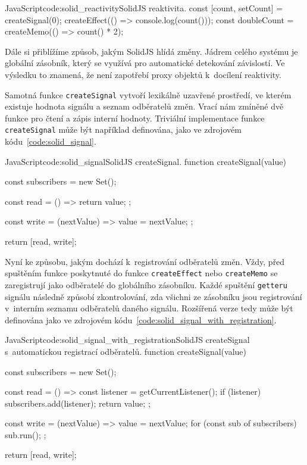 \documentclass[
  master,
  program=ainf,
  printversion,
  tables=false,
  sourcecodes,
  glossaries,
  index
]{kidiplom}
\begin{document}
  \begin{kicode}{JavaScript}{code:solid_reactivity}{SolidJS reaktivita.}
    const [count, setCount] = createSignal(0);
    createEffect(() => console.log(count()));
    const doubleCount = createMemo(() => count() * 2);
  \end{kicode}

Dále si přiblížíme způsob, jakým SolidJS hlídá změny. Jádrem celého systému je globální zásobník, který
se využívá pro automatické detekování závislostí. Ve výsledku to znamená, že není zapotřebí proxy objektů
k~docílení reaktivity.

Samotná funkce {\tt createSignal} vytvoří lexikálně uzavřené prostředí, ve kterém existuje hodnota
signálu a seznam odběratelů změn. Vrací nám zmíněné dvě funkce pro čtení a zápis interní hodnoty.
Triviální implementace funkce {\tt createSignal} může být například definována, jako ve zdrojovém 
kódu~\ref{code:solid_signal}.

  \begin{kicode}{JavaScript}{code:solid_signal}{SolidJS createSignal.}
    function createSignal(value) {
      const subscribers = new Set();

      const read = () => {
        return value;
      };

      const write = (nextValue) => {
        value = nextValue;
      };

      return [read, write];
    }
  \end{kicode}

Nyní ke způsobu, jakým dochází k~registrování odběratelů změn. Vždy, před spuštěním funkce poskytnuté do 
funkce {\tt createEffect} nebo {\tt createMemo} se zaregistrují jako odběratelé do globálního zásobníku. Každé spuštění
{\tt getteru} signálu následně způsobí zkontrolování, zda všichni ze zásobníku jsou registrování v~interním seznamu
odběratelů daného signálu. Rozšířená verze tedy může být definována jako ve zdrojovém kódu~\ref{code:solid_signal_with_registration}.

\begin{absolutelynopagebreak}
  \begin{kicode}{JavaScript}{code:solid_signal_with_registration}{SolidJS createSignal s~automatickou registrací odběratelů.}
    function createSignal(value) {
      const subscribers = new Set();

      const read = () => {
        const listener = getCurrentListener();
        if (listener) subscribers.add(listener);
        return value;
      };

      const write = (nextValue) => {
        value = nextValue;
        for (const sub of subscribers) sub.run();
      };

      return [read, write];
    }
\end{kicode}
\end{absolutelynopagebreak}
\end{document}
